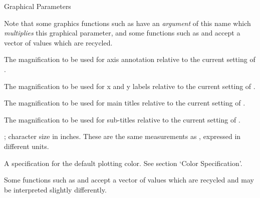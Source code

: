 \begin{Section}{Graphical Parameters}
\begin{description}
Note that some graphics functions such as
 have an \emph{argument} of this name
which \emph{multiplies} this graphical parameter, and some
functions such as  and 
accept a vector of values which are recycled.

\item[\code{cex.axis}] The magnification to be used for axis
annotation relative to the current setting of .
\item[\code{cex.lab}] The magnification to be used for x and y
labels relative to the current setting of .
\item[\code{cex.main}] The magnification to be used for main titles
relative to the current setting of .
\item[\code{cex.sub}] The magnification to be used for sub-titles
relative to the current setting of .
\item[\code{cin}] \emph{}; character size
 in inches.  These are the same measurements
as , expressed in different units.
\item[\code{col}] A specification for the default plotting color.  See
section `Color Specification'.

Some functions such as  and 
accept a vector of values which are recycled and may be
interpreted slightly differently.


\end{description}
\end{Section}
